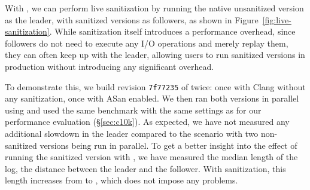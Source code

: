 With \varan, we can perform live sanitization by running the native unsanitized
version as the leader, with sanitized versions as followers, as shown in
Figure~\ref{fig:live-sanitization}.  While sanitization itself introduces a
performance overhead, since followers do not need to execute any I/O operations
and merely replay them, they can often keep up with the leader, allowing users
to run sanitized versions in production without introducing any significant
overhead.

To demonstrate this, we build revision \lstinline`7f77235` of \redis twice:
once with Clang without any sanitization, once with ASan enabled.  We then ran
both versions in parallel using \varan and used the same benchmark with the
same settings as for our performance evaluation (\S\ref{sec:c10k}). As
expected, we have not measured any additional slowdown in the leader compared
to the scenario with two non-sanitized versions being run in parallel. To get a
better insight into the effect of running the sanitized version with \varan, we
have measured the median length of the log, \ie the distance between the leader
and the follower. With sanitization, this length increases from
\redisNoSanitizationMedianLength to \redisSanitizationMedianLength, which does
not impose any problems.
